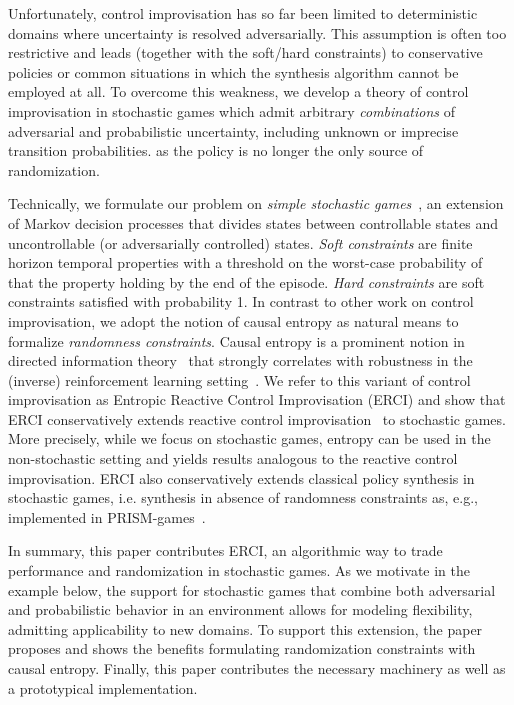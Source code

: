 Unfortunately, control improvisation has so far been limited to
deterministic domains where uncertainty is resolved
adversarially. This assumption is often too restrictive and leads
(together with the soft/hard constraints) to conservative policies or
common situations in which the synthesis algorithm cannot be employed
at all. To overcome this weakness, we develop a theory of control
improvisation in stochastic games which admit
arbitrary \emph{combinations} of adversarial and probabilistic
uncertainty, including unknown or imprecise transition
probabilities. as the policy is no longer the only source of
randomization.

Technically, we formulate our problem on \emph{simple stochastic
games}~\cite{DBLP:conf/dimacs/Condon90}, an extension of Markov decision processes that divides states
between controllable states and uncontrollable (or adversarially
controlled) states. \emph{Soft constraints} are finite horizon
temporal properties with a threshold on the worst-case probability of
that the property holding by the end of the episode. \emph{Hard
constraints} are soft constraints satisfied with probability 1. In
contrast to other work on control improvisation, we adopt the notion
of causal entropy as natural means to formalize \emph{randomness
constraints}.  Causal entropy is a prominent notion in directed
information theory~\cite{DirectedInfoTheoery} that strongly correlates with robustness in the
(inverse) reinforcement learning setting~\cite{mceThesis,
maxEntAnswer}. We refer to this variant of control improvisation as
Entropic Reactive Control Improvisation (ERCI) and show that ERCI
conservatively extends reactive control improvisation~\cite{DBLP:conf/cav/FremontS18} to stochastic
games. More precisely, while we focus on stochastic games, entropy can
be used in the non-stochastic setting and yields results analogous to
the reactive control improvisation. ERCI also conservatively extends  classical policy synthesis in stochastic games, i.e. synthesis in absence of randomness constraints as, e.g., implemented in PRISM-games~\cite{DBLP:journals/sttt/KwiatkowskaPW18}.


%
In summary, this paper contributes ERCI, an algorithmic way to trade 
performance and randomization in stochastic games. As we motivate in the example below, the support for stochastic games that combine both
adversarial and probabilistic behavior in an environment allows for
modeling flexibility, admitting applicability to new domains. To
support this extension, the paper proposes and shows the benefits
formulating randomization constraints with causal entropy.  Finally,
this paper contributes the necessary machinery as well as a
prototypical implementation.

